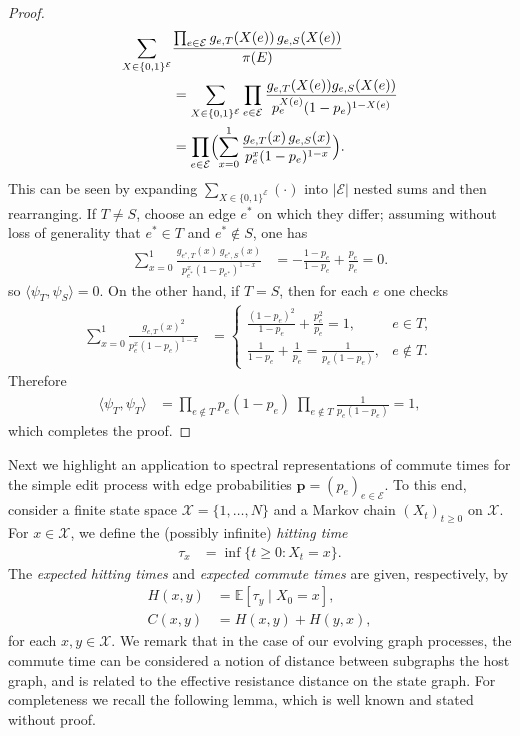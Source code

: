 \documentclass[11pt,a4paper]{article}
\begin{document}
\begin{proof}
\begin{align*}
            \sum_{X\in\{0,1\}^{\mathcal E}}&\frac{\prod_{e\in\mathcal{E}}g_{e,T}(X(e))\,g_{e,S}(X(e))}{\pi(E)}\\
            &=\sum_{X\in\{0,1\}^{\mathcal E}} \prod_{e\in\mathcal{E}} \frac{g_{e,T}(X(e)) g_{e,S}(X(e))}{p_e^{X(e)}(1-p_e)^{1-X(e)}}\\
            &=\prod_{e\in\mathcal E}
            \Bigl(\sum_{x=0}^1\frac{g_{e,T}(x)\,g_{e,S}(x)}{p_e^x(1-p_e)^{1-x}}\Bigr).
        \end{align*}
    This can be seen by expanding $\sum_{X\in\{0,1\}^{\mathcal E}}(\cdot)$ into $|\mathcal{E}|$ nested sums and then rearranging. If $T\neq S$, choose an edge $e^\ast$ on which they differ; assuming without loss of generality that $e^\ast\in T$ and $e^\ast\notin S$, one has
        \begin{align*}
            \sum_{x=0}^1\frac{g_{e^\ast,T}(x)\,g_{e^\ast,S}(x)}{p_{e^\ast}^x(1-p_{e^\ast})^{1-x}}
            &=-\frac{1-p_e}{1-p_e} + \frac{p_e}{p_e} = 0.
        \end{align*}
    so $\langle\psi_T,\psi_S\rangle=0$. On the other hand, if $T=S$, then for each $e$ one checks
        \begin{align*}
        \sum_{x=0}^1\frac{g_{e,T}(x)^2}{p_e^x(1-p_e)^{1-x}}
        &=
        \begin{cases}
        \frac{(1-p_e)^2}{1-p_e}+\frac{p_e^2}{p_e}=1,&e\in T,\\
        \frac{1}{1-p_e}+\frac{1}{p_e}=\frac{1}{p_e(1-p_e)},&e\notin T.
        \end{cases}
        \end{align*}
    Therefore
        \begin{align*}
        \langle\psi_T,\psi_T\rangle
        &=\prod_{e\notin T}p_e(1-p_e)
        \;\prod_{e\notin T}\frac1{p_e(1-p_e)}
        =1,
        \end{align*}
    which completes the proof.
\end{proof}

Next we highlight an application to spectral representations of commute times for the simple edit process with edge probabilities $\mathbf{p} = (p_e)_{e\in\mathcal{E}}$. To this end, consider a finite state space $\mathcal X=\{1,\dots,N\}$ and a Markov chain $(X_t)_{t\geq 0}$ on $\mathcal X$. For $x\in\mathcal{X}$, we define the (possibly infinite) \emph{hitting time}
    \begin{align*}
        \tau_x &= \inf \{t\geq 0 : X_t = x\}.
    \end{align*}
The \emph{expected hitting times} and \emph{expected commute times} are given, respectively, by
    \begin{align*}
        H(x, y) &= \mathbb{E}\left[\tau_y \mid X_0 = x\right],\\
        C(x, y) &= H(x, y) + H(y, x),
    \end{align*}
for each $x,y\in\mathcal{X}$. We remark that in the case of our evolving graph processes, the commute time can be considered a notion of distance between subgraphs the host graph, and is related to the effective resistance distance on the state graph. For completeness we recall the following lemma, which is well known and stated without proof.
\end{document}
